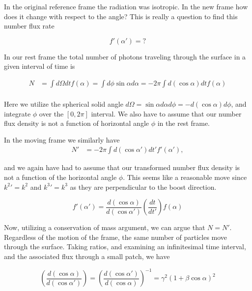 In the original reference frame the radiation was isotropic.  In the new frame how does it change with respect to the angle?  This is really a question to find this number flux rate

\begin{equation}\label{eqn:relativisticElectrodynamicsT1:150}
f'(\alpha') = ?
\end{equation}

In our rest frame the total number of photons traveling through the surface in a given interval of time is

\begin{align}\label{eqn:relativisticElectrodynamicsT1:160}
N &= \int d\Omega dt f(\alpha) = \int d \phi \sin \alpha d\alpha = -2 \pi \int d(\cos\alpha) dt f(\alpha) \\
\end{align}

Here we utilize the spherical solid angle $d\Omega = \sin \alpha d\alpha d\phi = - d(\cos\alpha) d\phi$, and integrate $\phi$ over the $[0, 2\pi]$ interval.  We also have to assume that our number flux density is not a function of horizontal angle $\phi$ in the rest frame.

In the moving frame we similarly have
\begin{align}\label{eqn:relativisticElectrodynamicsT1:160b}
N' &= -2 \pi \int d(\cos\alpha') dt' f'(\alpha'),
\end{align}

and we again have had to assume that our transformed number flux density is not a function of the horizontal angle $\phi$.  This seems like a reasonable move since ${k^2}' = k^2$ and ${k^3}' = k^3$ as they are perpendicular to the boost direction.

\begin{equation}\label{eqn:relativisticElectrodynamicsT1:170}
f'(\alpha') = \frac{d(\cos\alpha)}{d(\cos\alpha')} \left( \frac{dt}{dt'} \right) f(\alpha)
\end{equation}


Now, utilizing a conservation of mass argument, we can argue that $N = N'$.  Regardless of the motion of the frame, the same number of particles move through the surface.  Taking ratios, and examining an infinitesimal time interval, and the associated flux through a small patch, we have

\begin{equation}\label{eqn:relativisticElectrodynamicsT1:180}
\left( \frac{d(\cos\alpha)}{d(\cos\alpha')} \right) = \left( \frac{d(\cos\alpha')}{d(\cos\alpha)} \right)^{-1} = \gamma^2 ( 1 + \beta \cos\alpha)^2
\end{equation}

